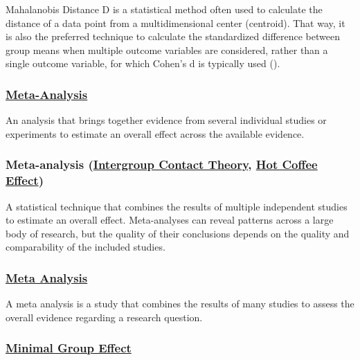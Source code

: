 \documentclass[
  letterpaper,
]{book}
\begin{document}
Mahalanobis Distance D is a statistical method often used to calculate
the distance of a data point from a multidimensional center (centroid).
That way, it is also the preferred technique to calculate the
standardized difference between group means when multiple outcome
variables are considered, rather than a single outcome variable, for
which Cohen's d is typically used
().

\subsubsection*{\texorpdfstring{\hyperref[def-metaanalysis]{Meta-Analysis}}{Meta-Analysis}}\label{meta-analysis}

An analysis that brings together evidence from several individual
studies or experiments to estimate an overall effect across the
available evidence.

\subsubsection*{\texorpdfstring{Meta-analysis
(\hyperref[def-meta-analysis]{Intergroup Contact Theory},
\hyperref[def-meta-analysis]{Hot Coffee
Effect})}{Meta-analysis (Intergroup Contact Theory, Hot Coffee Effect)}}\label{meta-analysis-intergroup-contact-theory-hot-coffee-effect}

A statistical technique that combines the results of multiple
independent studies to estimate an overall effect. Meta-analyses can
reveal patterns across a large body of research, but the quality of
their conclusions depends on the quality and comparability of the
included studies.

\subsubsection*{\texorpdfstring{\hyperref[def-metaanalysis]{Meta
Analysis}}{Meta Analysis}}\label{meta-analysis-1}

A meta analysis is a study that combines the results of many studies to
assess the overall evidence regarding a research question.

\subsubsection*{\texorpdfstring{\hyperref[def-minimalgroupeffect]{Minimal
Group Effect}}{Minimal Group Effect}}\label{minimal-group-effect-1}
\end{document}
